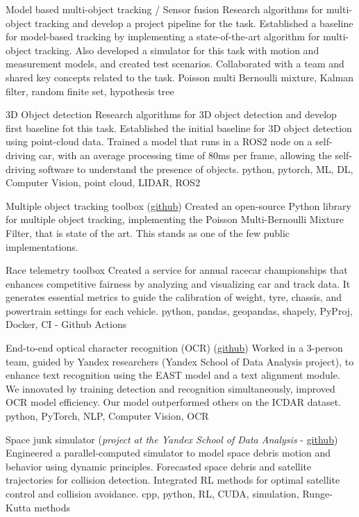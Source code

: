 \documentclass[]{resume}
\begin{document}
\project
{Model based multi-object tracking / Sensor fusion}
{Research algorithms for multi-object tracking and develop a project pipeline for the task.}
{Established a baseline for model-based tracking by implementing a state-of-the-art algorithm for multi-object tracking. Also developed a simulator for this task with motion and measurement models, and created test scenarios. Collaborated with a team and shared key concepts related to the task.}
{Poisson multi Bernoulli mixture, Kalman filter, random finite set, hypothesis tree}

\project
{3D Object detection}
{Research algorithms for 3D object detection and develop first baseline fot this task.}
{Established the initial baseline for 3D object detection using point-cloud data. Trained a model that runs in a ROS2 node on a self-driving car, with an average processing time of 80ms per frame, allowing the self-driving software to understand the presence of objects.}
{python, pytorch, ML, DL, Computer Vision, point cloud, LIDAR, ROS2}

\par \noindent
{}
\project
{Multiple object tracking toolbox (\href{https://github.com/neer201/Multi-Object-Tracking-for-Automotive-Systems-in-python}{github})}
{}
{Created an open-source Python library for multiple object tracking, implementing the Poisson Multi-Bernoulli Mixture Filter, that is state of the art. This stands as one of the few public implementations.}
{}

\project
{Race telemetry toolbox}
{}
{Created a service for annual racecar championships that enhances competitive fairness by analyzing and visualizing car and track data. It generates essential metrics to guide the calibration of weight, tyre, chassis, and powertrain settings for each vehicle.}
{python, pandas, geopandas, shapely, PyProj, Docker, CI - Github Actions}

\project
{End-to-end optical character recognition (OCR) (\href{https://github.com/kharitonov-ivan/end2end_OCR}{github})}
{}
{Worked in a 3-person team, guided by Yandex researchers (Yandex School of Data Analysis project), to enhance text recognition using the EAST model and a text alignment module. We innovated by training detection and recognition simultaneously, improved OCR model efficiency. Our model outperformed others on the ICDAR dataset.}
{python, PyTorch, NLP, Computer Vision, OCR}

\project
{Space junk simulator (\textit{project at the Yandex School of Data Analysis} - \href{https://github.com/neer201/space_junk_simulator}{github})}
{}
{Engineered a parallel-computed simulator to model space debris motion and behavior using dynamic principles. Forecasted space debris and satellite trajectories for collision detection. Integrated RL methods for optimal satellite control and collision avoidance.}
{cpp, python, RL, CUDA, simulation, Runge-Kutta methods}
\end{document}
